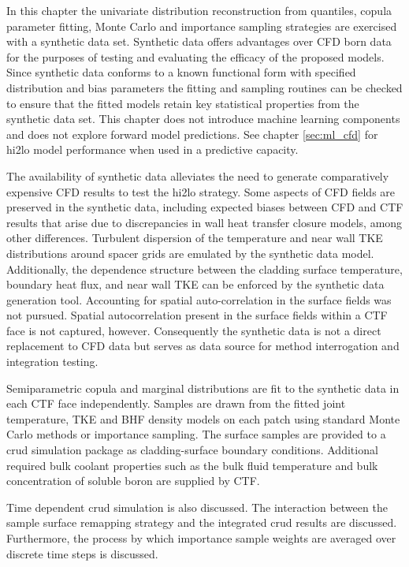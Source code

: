 
In this chapter the univariate distribution reconstruction from quantiles, copula parameter fitting, Monte Carlo and importance sampling strategies are exercised with a synthetic data set.  Synthetic data offers advantages over CFD born data for the purposes of testing and evaluating the efficacy of the proposed models.  Since synthetic data conforms to a known functional form with specified distribution and bias parameters the fitting and sampling routines can be checked to ensure that the fitted models retain key statistical properties from the synthetic data set. This chapter does not introduce machine learning components and does not explore forward model predictions.  See chapter \ref{sec:ml_cfd} for hi2lo model performance when used in a predictive capacity.

The availability of synthetic data alleviates the need to generate comparatively expensive CFD results to test the hi2lo strategy.  Some aspects of CFD fields are preserved in the synthetic data, including expected biases between CFD and CTF results that arise due to discrepancies in wall heat transfer closure models, among other differences.  Turbulent dispersion of the temperature and near wall TKE distributions around spacer grids are emulated by the synthetic data model.  Additionally, the dependence structure between the cladding surface temperature, boundary heat flux, and near wall TKE can be enforced by the synthetic data generation tool.  Accounting for spatial auto-correlation in the surface fields was not pursued.  Spatial autocorrelation present in the surface fields within a CTF face is not captured, however.  Consequently the synthetic data is not a direct replacement to CFD data but serves as data source for method interrogation and integration testing.

Semiparametric copula and marginal distributions are fit to the synthetic data in each CTF face independently.  Samples are drawn from the fitted joint temperature, TKE and BHF density models on each patch using standard Monte Carlo methods or importance sampling.  The surface samples are provided to a crud simulation package as cladding-surface boundary conditions.  Additional required bulk coolant properties such as the bulk fluid temperature and bulk concentration of soluble boron are supplied by CTF.

Time dependent crud simulation is also discussed.  The interaction between the sample surface remapping strategy and the integrated crud results are discussed.  Furthermore, the process by which importance sample weights are averaged over discrete time steps is discussed.

